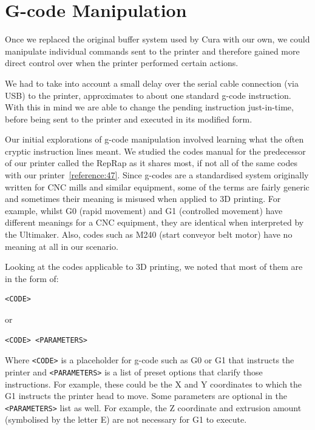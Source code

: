 \documentclass[11pt]{report} %
\begin{document}
\section{G-code Manipulation}
\label{section:GCodeManipulation}
Once we replaced the original buffer system used by Cura with our own, we could manipulate individual commands sent to the printer and therefore gained more direct control over when the printer performed certain actions.

We had to take into account a small delay over the serial cable connection (via USB) to the printer, approximates to about one standard g-code instruction. With this in mind we are able to change the pending instruction just-in-time, before being sent to the printer and executed in its modified form.

Our initial explorations of g-code manipulation involved learning what the often cryptic instruction lines meant. We studied the codes manual for the predecessor of our printer called the RepRap as it shares most, if not all of the same codes with our printer~\ref{reference:47}. Since g-codes are a standardised system originally written for CNC mills and similar equipment, some of the terms are fairly generic and sometimes their meaning is misused when applied to 3D printing. For example, whilst G0 (rapid movement) and G1 (controlled movement) have different meanings for a CNC equipment, they are identical when interpreted by the Ultimaker. Also, codes such as M240 (start conveyor belt motor) have no meaning at all in our scenario.

Looking at the codes applicable to 3D printing, we noted that most of them are in the form of:
\begin{verbatim}
<CODE>
\end{verbatim}
or
\begin{verbatim}
<CODE> <PARAMETERS>
\end{verbatim}

Where \verb|<CODE>| is a placeholder for g-code such as G0 or G1 that instructs the printer and \verb|<PARAMETERS>| is a list of preset options that clarify those instructions. For example, these could be the X and Y coordinates to which the G1 instructs the printer head to move. Some parameters are optional in the \verb|<PARAMETERS>| list as well. For example, the Z coordinate and extrusion amount (symbolised by the letter E) are not necessary for G1 to execute.
\end{document}
